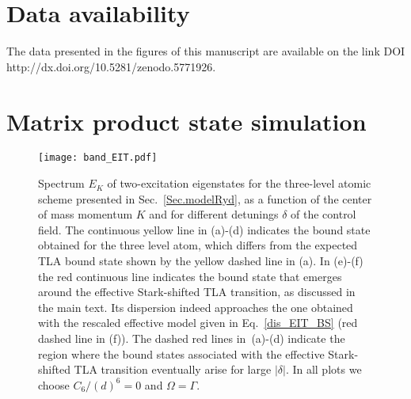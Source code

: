 \documentclass[pra,twocolumn,showpacs,preprintnumbers,amsmath,amssymb]{revtex4-1}
\begin{document}
\section*{Data  availability} The data presented in the figures of this manuscript are available on the link 
 DOI http://dx.doi.org/10.5281/zenodo.5771926.

\appendix

\section{Matrix product state simulation}\label{AppMPS}

\begin{figure*}[!t]
\texttt{[image: band\_EIT.pdf]}%
\caption{Spectrum $E_K$ of two-excitation eigenstates for the three-level atomic scheme presented in Sec.~\ref{Sec.modelRyd}, as a function of the center of mass momentum $K$ and for different detunings $\delta$ of the control field.  The continuous yellow line in (a)-(d) indicates the bound state obtained for the three level atom, which differs from the expected TLA bound state shown by the yellow dashed line in (a). In (e)-(f) the red continuous line indicates the bound state that emerges around the effective Stark-shifted TLA transition, as discussed in the main text. Its dispersion indeed approaches the one obtained with the rescaled effective model given in Eq.~\eqref{dis_EIT_BS} (red dashed line in (f)).
The dashed red lines in~(a)-(d) indicate the region where the bound states associated with the effective Stark-shifted TLA transition eventually arise for large $|\delta|$. In all plots we choose $C_6/(d)^6=0$ and $\Omega=\Gamma$.}
\label{Fig.Eit_band}
\end{figure*}
\end{document}
